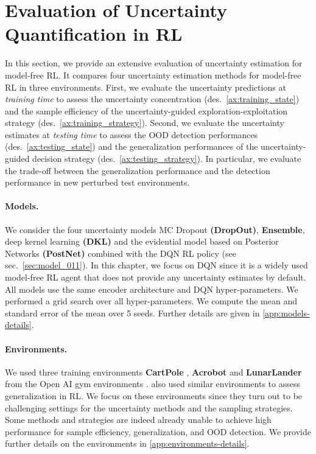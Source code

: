 \vspace{-3mm}
\section{Evaluation of Uncertainty Quantification in RL}
\label{sec:experiments_011}

In this section, we provide an extensive evaluation of uncertainty estimation for model-free RL. It compares four uncertainty estimation methods for model-free RL in three environments. First, we evaluate the uncertainty predictions at \emph{training time} to assess the uncertainty concentration (des.~\ref{ax:training_state}) and the sample efficiency of the uncertainty-guided exploration-exploitation strategy (des.~\ref{ax:training_strategy}). Second, we evaluate the uncertainty estimates at \emph{testing time} to assess the OOD detection performances (des.~\ref{ax:testing_state}) and the generalization performances of the uncertainty-guided decision strategy (des.~\ref{ax:testing_strategy}). In particular, we evaluate the trade-off between the generalization performance and the detection performance in new perturbed test environments.

\paragraph{Models.} We consider the four uncertainty models MC Dropout \textbf{(DropOut)}, \textbf{Ensemble}, deep kernel learning \textbf{(DKL)} and the evidential model based on Posterior Networks \textbf{(PostNet)} combined with the DQN RL policy (see sec.~\ref{sec:model_011}). In this chapter, we focus on DQN \citep{dqn} since it is a widely used model-free RL agent that does not provide any uncertainty estimates by default. All models use the same encoder architecture and DQN hyper-parameters. We performed a grid search over all hyper-parameters. We compute the mean and standard error of the mean over 5 seeds. Further details are given in \cref{app:models-details}.

\paragraph{Environments.} We used three training environments \textbf{CartPole} \citep{cartpole}, \textbf{Acrobot} \citep{acrobot1, acrobot2} and \textbf{LunarLander} \citep{lunarlander1} from the Open AI gym environments \citep{gym}. \citet{assessing-generalization-rl} also used similar environments to assess generalization in RL. We focus on these environments since they turn out to be challenging settings for the uncertainty methods and the sampling strategies. Some methods and strategies are indeed already unable to achieve high performance for sample efficiency, generalization, and OOD detection. We provide further details on the environments in \cref{app:environments-details}. 

